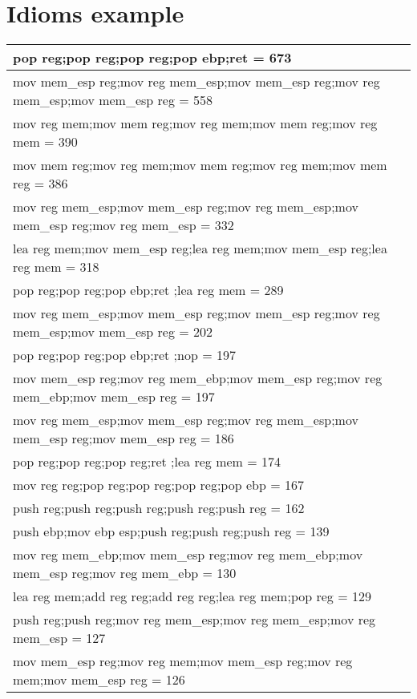 \section{Idioms example}
\begin{table*}[h!]
	\begin{center}

\begin{tabular}{ | l |}
pop reg;pop reg;pop reg;pop ebp;ret   = 673\\  \hline 
mov mem\_esp reg;mov reg mem\_esp;mov mem\_esp reg;mov reg mem\_esp;mov mem\_esp reg = 558\\  \hline 
mov reg mem;mov mem reg;mov reg mem;mov mem reg;mov reg mem = 390\\  \hline 
mov mem reg;mov reg mem;mov mem reg;mov reg mem;mov mem reg = 386\\  \hline 
mov reg mem\_esp;mov mem\_esp reg;mov reg mem\_esp;mov mem\_esp reg;mov reg mem\_esp = 332\\  \hline 
lea reg mem;mov mem\_esp reg;lea reg mem;mov mem\_esp reg;lea reg mem = 318\\  \hline 
pop reg;pop reg;pop ebp;ret ;lea reg mem = 289\\  \hline 
mov reg mem\_esp;mov mem\_esp reg;mov mem\_esp reg;mov reg mem\_esp;mov mem\_esp reg = 202\\  \hline 
pop reg;pop reg;pop ebp;ret ;nop   = 197\\  \hline 
mov mem\_esp reg;mov reg mem\_ebp;mov mem\_esp reg;mov reg mem\_ebp;mov mem\_esp reg = 197\\  \hline 
mov reg mem\_esp;mov mem\_esp reg;mov reg mem\_esp;mov mem\_esp reg;mov mem\_esp reg = 186\\  \hline 
pop reg;pop reg;pop reg;ret ;lea reg mem = 174\\  \hline 
mov reg reg;pop reg;pop reg;pop reg;pop ebp  = 167\\  \hline 
push reg;push reg;push reg;push reg;push reg  = 162\\  \hline 
push ebp;mov ebp esp;push reg;push reg;push reg  = 139\\  \hline 
mov reg mem\_ebp;mov mem\_esp reg;mov reg mem\_ebp;mov mem\_esp reg;mov reg mem\_ebp = 130\\  \hline 
lea reg mem;add reg reg;add reg reg;lea reg mem;pop reg  = 129\\  \hline 
push reg;push reg;mov reg mem\_esp;mov reg mem\_esp;mov reg mem\_esp = 127\\  \hline 
mov mem\_esp reg;mov reg mem;mov mem\_esp reg;mov reg mem;mov mem\_esp reg = 126\\  \hline 

\end{tabular}
\end{center}
\end{table*}
